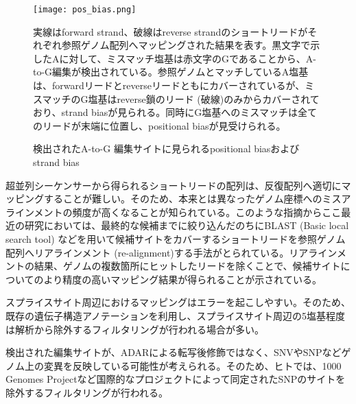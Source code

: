 \begin{figure}[!h]
	\begin{center}
		\texttt{[image: pos\_bias.png]}
	\end{center}
	\caption{検出されたA-to-G 編集サイトに見られるpositional biasおよびstrand bias}
	\begin{flushleft}
		\small{実線はforward strand、破線はreverse strandのショートリードがそれぞれ参照ゲノム配列へマッピングされた結果を表す。黒文字で示したAに対して、ミスマッチ塩基は赤文字のGであることから、A-to-G編集が検出されている。参照ゲノムとマッチしているA塩基は、forwardリードとreverseリードともにカバーされているが、ミスマッチのG塩基はreverse鎖のリード (破線)のみからカバーされており、strand biasが見られる。同時にG塩基へのミスマッチは全てのリードが末端に位置し、positional biasが見受けられる。}
	\end{flushleft}
	\label{fig:positional_bias}
\end{figure}

超並列シーケンサーから得られるショートリードの配列は、反復配列へ適切にマッピングすることが難しい。そのため、本来とは異なったゲノム座標へのミスアラインメントの頻度が高くなることが知られている。このような指摘からここ最近の研究においては、最終的な候補までに絞り込んだのちにBLAST (Basic local search tool) \citep{altschul1990basic}などを用いて候補サイトをカバーするショートリードを参照ゲノム配列へリアラインメント (re-alignment)する手法がとられている。リアラインメントの結果、ゲノムの複数箇所にヒットしたリードを除くことで、候補サイトについてのより精度の高いマッピング結果が得られることが示されている。
\par
スプライスサイト周辺におけるマッピングはエラーを起こしやすい。そのため、既存の遺伝子構造アノテーションを利用し、スプライスサイト周辺の5塩基程度は解析から除外するフィルタリングが行われる場合が多い。
\par
検出された編集サイトが、ADARによる転写後修飾ではなく、SNVやSNPなどゲノム上の変異を反映している可能性が考えられる。そのため、ヒトでは、1000 Genomes Projectなど国際的なプロジェクトによって同定されたSNPのサイトを除外するフィルタリングが行われる。

